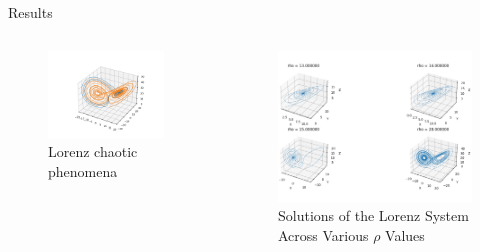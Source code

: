 \documentclass[aspectratio=169,xcolor=dvipsnames, t]{beamer}
\begin{document}
\begin{frame}{Results}
    \begin{columns}
\begin{column}{0.5\textwidth}
   \begin{figure}[ht!]
    \centering
    \includegraphics[width=0.9\textwidth]{figures/Figure_1.png}
    \caption{Lorenz chaotic phenomena}
    \label{fig:4}
\end{figure}
\end{column}
\begin{column}{0.5\textwidth}  %
    \begin{center}
     \begin{figure}[H]
    \centering
    \includegraphics[width=.85\textwidth]{figures/lorenz_rho.png}
    \caption{Solutions of the Lorenz System Across Various $\rho$ Values}
    \label{fig:8}
\end{figure}
     \end{center}
\end{column}
\end{columns}
\end{frame}
\end{document}
